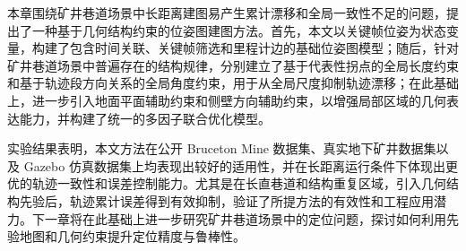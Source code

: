 本章围绕矿井巷道场景中长距离建图易产生累计漂移和全局一致性不足的问题，提出了一种基于几何结构约束的位姿图建图方法。首先，本文以关键帧位姿为状态变量，构建了包含时间关联、关键帧筛选和里程计边的基础位姿图模型；随后，针对矿井巷道场景中普遍存在的结构规律，分别建立了基于代表性拐点的全局长度约束和基于轨迹段方向关系的全局角度约束，用于从全局尺度抑制轨迹漂移；在此基础上，进一步引入地面平面辅助约束和侧壁方向辅助约束，以增强局部区域的几何表达能力，并构建了统一的多因子联合优化模型。

实验结果表明，本文方法在公开 Bruceton Mine 数据集、真实地下矿井数据集以及 Gazebo 仿真数据集上均表现出较好的适用性，并在长距离运行条件下体现出更优的轨迹一致性和误差控制能力。尤其是在长直巷道和结构重复区域，引入几何结构先验后，轨迹累计误差得到有效抑制，验证了所提方法的有效性和工程应用潜力。下一章将在此基础上进一步研究矿井巷道场景中的定位问题，探讨如何利用先验地图和几何约束提升定位精度与鲁棒性。

